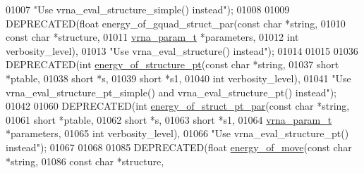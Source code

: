 \begin{DoxyCode}
01007            \textcolor{stringliteral}{"Use vrna\_eval\_structure\_simple() instead"});
01008 
01009 DEPRECATED(\textcolor{keywordtype}{float} energy\_of\_gquad\_struct\_par(\textcolor{keyword}{const} \textcolor{keywordtype}{char}    *\textcolor{keywordtype}{string},
01010                                             \textcolor{keyword}{const} \textcolor{keywordtype}{char}    *structure,
01011                                             \hyperlink{group__energy__parameters_structvrna__param__s}{vrna\_param\_t}  *parameters,
01012                                             \textcolor{keywordtype}{int}           verbosity\_level),
01013            \textcolor{stringliteral}{"Use vrna\_eval\_structure() instead"});
01014 
01015 
01036 DEPRECATED(\textcolor{keywordtype}{int} \hyperlink{group__eval_ga8831445966b761417e713360791299d8}{energy\_of\_structure\_pt}(\textcolor{keyword}{const} \textcolor{keywordtype}{char}  *\textcolor{keywordtype}{string},
01037                                       \textcolor{keywordtype}{short}       *ptable,
01038                                       \textcolor{keywordtype}{short}       *s,
01039                                       \textcolor{keywordtype}{short}       *s1,
01040                                       \textcolor{keywordtype}{int}         verbosity\_level),
01041            \textcolor{stringliteral}{"Use vrna\_eval\_structure\_pt\_simple() and vrna\_eval\_structure\_pt() instead"});
01042 
01060 DEPRECATED(\textcolor{keywordtype}{int} \hyperlink{group__eval_ga49acb3d5627dc6823a7ce12d116d4c69}{energy\_of\_struct\_pt\_par}(\textcolor{keyword}{const} \textcolor{keywordtype}{char}   *\textcolor{keywordtype}{string},
01061                                        \textcolor{keywordtype}{short}        *ptable,
01062                                        \textcolor{keywordtype}{short}        *s,
01063                                        \textcolor{keywordtype}{short}        *s1,
01064                                        \hyperlink{group__energy__parameters_structvrna__param__s}{vrna\_param\_t} *parameters,
01065                                        \textcolor{keywordtype}{int}          verbosity\_level),
01066            \textcolor{stringliteral}{"Use vrna\_eval\_structure\_pt() instead"});
01067 
01068 
01085 DEPRECATED(\textcolor{keywordtype}{float} \hyperlink{group__eval_ga539ecaed89730f7644c202f304d7529b}{energy\_of\_move}(\textcolor{keyword}{const} \textcolor{keywordtype}{char}  *\textcolor{keywordtype}{string},
01086                                 \textcolor{keyword}{const} \textcolor{keywordtype}{char}  *structure,

\end{DoxyCode}
